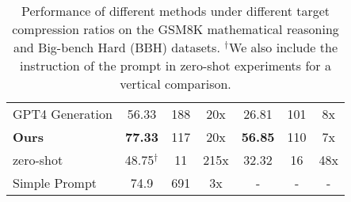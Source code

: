 \begin{table}[tb]
{\begin{tabular}{l|ccc|ccc}
    GPT4 Generation & 56.33 & 188 & 20x & 26.81 & 101 & 8x \\
    {\cellcolor[rgb]{0.925,0.957,1}}\textbf{Ours} & {\cellcolor[rgb]{0.925,0.957,1}}\textbf{77.33} & {\cellcolor[rgb]{0.925,0.957,1}}117 & {\cellcolor[rgb]{0.925,0.957,1}}20x & {\cellcolor[rgb]{0.925,0.957,1}}\textbf{56.85} & {\cellcolor[rgb]{0.925,0.957,1}}110 & {\cellcolor[rgb]{0.925,0.957,1}}7x \\
     \hline
     \hline
    zero-shot & 48.75$^{\dag}$ & 11 & 215x & 32.32 & 16 & 48x \\
    Simple Prompt & 74.9 & 691 & 3x & - & - & - \\
    \bottomrule
    \end{tabular}
    }
    \caption{Performance of different methods under different target compression ratios on the GSM8K mathematical reasoning and Big-bench Hard (BBH) datasets. $^{\dag}$We also include the instruction of the prompt in zero-shot experiments for a vertical comparison.}
    \label{tab:main_results}
\end{table}